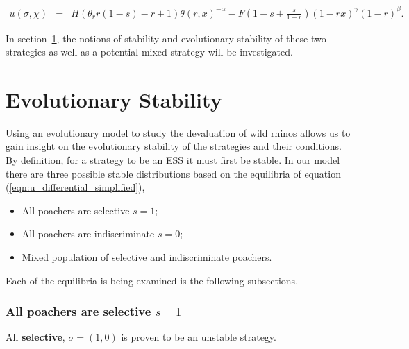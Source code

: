 \documentclass[10pt]{article}
\begin{document}
\begin{eqnarray}
\label{eqn:tutility2}
u(\sigma, \chi) &=&
H (\theta_r r(1-s) - r + 1)\theta(r,x)^{-\alpha} - F\left(1-s + \frac{s}{1-r} \right)(1-rx)^{\gamma}(1-r)^{\beta} .
\end{eqnarray}

In section~\ref{section:evolutionary_stability}, the notions of stability
and evolutionary stability of these two strategies as well as a potential 
mixed strategy will be investigated.

\section{Evolutionary Stability}\label{section:evolutionary_stability}

Using an evolutionary model to study the devaluation of wild rhinos allows us 
to gain insight on the evolutionary stability of the strategies and their conditions.
By definition, for a strategy to be an ESS it must first be stable.
In our model there are three possible stable distributions based on the
equilibria of equation (\ref{eqn:u_differential_simplified}),

\begin{itemize} 
	\item All poachers are selective \(s=1\);
	\item All poachers are indiscriminate \(s=0\);
	\item Mixed population of selective and indiscriminate poachers.
\end{itemize}

Each of the equilibria is being examined is the following subsections.

\subsubsection{All poachers are selective \(s=1\)}

All \textbf{selective}, \(\sigma=(1, 0)\) is proven to be an unstable strategy.
\end{document}
